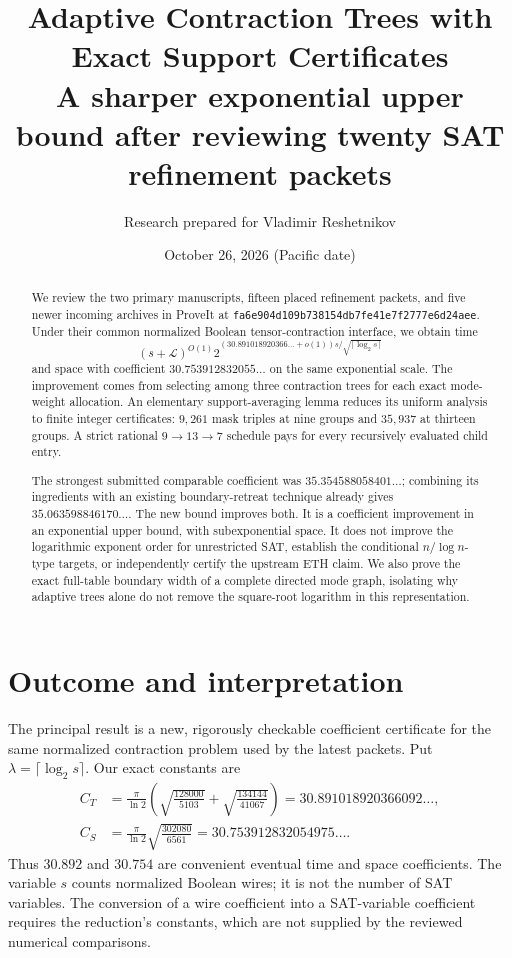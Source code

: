 \documentclass[11pt]{article}
\title{Adaptive Contraction Trees with Exact Support Certificates\\[5pt]
\large A sharper exponential upper bound after reviewing twenty SAT refinement packets}
\author{Research prepared for Vladimir Reshetnikov}
\date{October 26, 2026 \quad (Pacific date)}
\theoremstyle{remark}\newtheorem{remark}[theorem]{Remark}
\newcommand{\pin}{\texttt{fa6e904d109b738154db7fe41e7f2777e6d24aee}}
\begin{document}
\maketitle
\begin{abstract}
We review the two primary manuscripts, fifteen placed refinement packets, and
five newer incoming archives in ProveIt at \pin. Under their common normalized
Boolean tensor-contraction interface, we obtain time
\[
 (s+\mathcal L)^{O(1)}
 2^{(30.891018920366\ldots+o(1))s/\sqrt{\lceil\log_2s\rceil}}
\]
and space with coefficient $30.753912832055\ldots$ on the same exponential
scale. The improvement comes from selecting among three contraction trees for
each exact mode-weight allocation. An elementary support-averaging lemma
reduces its uniform analysis to finite integer certificates: $9{,}261$ mask
triples at nine groups and $35{,}937$ at thirteen groups. A strict rational
$9\to13\to7$ schedule pays for every recursively evaluated child entry.

The strongest submitted comparable coefficient was $35.354588058401\ldots$;
combining its ingredients with an existing boundary-retreat technique already
gives $35.063598846170\ldots$. The new bound improves both. It is a
coefficient improvement in an exponential upper bound, with subexponential
space. It does not improve the logarithmic exponent order for unrestricted
SAT, establish the conditional $n/\log n$-type targets, or independently
certify the upstream ETH claim. We also prove the exact full-table boundary
width of a complete directed mode graph, isolating why adaptive trees alone
do not remove the square-root logarithm in this representation.
\end{abstract}
\setcounter{tocdepth}{1}
\tableofcontents
\newpage

\section{Outcome and interpretation}
\label{sec:outcome}

The principal result is a new, rigorously checkable coefficient certificate
for the same normalized contraction problem used by the latest packets.
Put $\lambda=\lceil\log_2s\rceil$. Our exact constants are
\begin{align}
 C_T&=\frac{\pi}{\ln2}
 \left(\sqrt{\frac{128000}{5103}}+
       \sqrt{\frac{134144}{41067}}\right)
   =30.891018920366092\ldots,\label{eq:CT}\\
 C_S&=\frac{\pi}{\ln2}\sqrt{\frac{302080}{6561}}
   =30.753912832054975\ldots.\label{eq:CS}
\end{align}
Thus $30.892$ and $30.754$ are convenient eventual time and space coefficients.
The variable $s$ counts normalized Boolean wires; it is not the number of SAT
variables. The conversion of a wire coefficient into a SAT-variable
coefficient requires the reduction's constants, which are not supplied by
the reviewed numerical comparisons.
\end{document}
